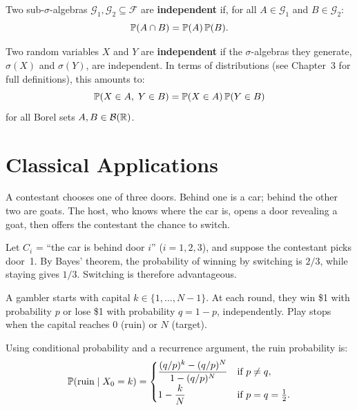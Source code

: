 \begin{definition}
Two sub-$\sigma$-algebras $\mathcal{G}_1, \mathcal{G}_2 \subseteq \mathcal{F}$
are \textbf{independent} if, for all $A \in \mathcal{G}_1$ and
$B \in \mathcal{G}_2$:
\[
    \mathbb{P}(A \cap B) = \mathbb{P}(A)\,\mathbb{P}(B).
\]
\end{definition}

\begin{definition}
Two random variables $X$ and $Y$ are \textbf{independent} if the $\sigma$-algebras
they generate, $\sigma(X)$ and $\sigma(Y)$, are independent. In terms of
distributions (see Chapter~3 for full definitions), this amounts to:
\[
    \mathbb{P}(X \in A,\; Y \in B) = \mathbb{P}(X \in A)\,\mathbb{P}(Y \in B)
\]
for all Borel sets $A, B \in \mathcal{B}(\mathbb{R})$.
\end{definition}

\section{Classical Applications}

\begin{example}
A contestant chooses one of three doors. Behind one is a car; behind the other
two are goats. The host, who knows where the car is, opens a door revealing a
goat, then offers the contestant the chance to switch.

Let $C_i$ = ``the car is behind door $i$'' ($i=1,2,3$), and suppose the contestant
picks door~1. By Bayes' theorem, the probability of winning by switching is $2/3$,
while staying gives $1/3$. Switching is therefore advantageous.
\end{example}

\begin{example}
A gambler starts with capital $k \in \{1, \ldots, N-1\}$. At each round, they win
\$1 with probability $p$ or lose \$1 with probability $q = 1-p$, independently.
Play stops when the capital reaches 0 (ruin) or $N$ (target).

Using conditional probability and a recurrence argument, the ruin probability is:
\[
    \mathbb{P}(\text{ruin} \mid X_0 = k) =
    \begin{cases}
        \dfrac{(q/p)^k - (q/p)^N}{1 - (q/p)^N} & \text{if } p \neq q, \\[6pt]
        1 - \dfrac{k}{N} & \text{if } p = q = \tfrac{1}{2}.
    \end{cases}
\]
\end{example}


